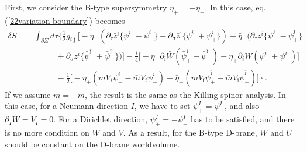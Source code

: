 \documentclass[a4paper,12pt]{article}
\numberwithin{equation}{section}
\newcommand{\del}{\partial}
\newcommand{\ib}{\bar{\imath}}
\newcommand{\jb}{\bar{\jmath}}
\newcommand{\mb}{\bar{m}}
\newcommand{\zb}{\bar{z}}
\newcommand{\nn}{\nonumber\\}
\newcommand{\psb}{\bar{\psi}}
\newcommand{\etb}{\bar{\eta}}
\newcommand{\Wb}{\bar{W}}
\begin{document}
First, we consider the B-type supersymmetry $\eta_{+}=-\eta_{-}$.
In this case, eq.(\ref{22variation-boundary}) becomes
\begin{align}
 \delta S &= \int_{\del \Sigma}d\tau\Bigg\{
\frac12 g_{i\jb}\Big[
  -\eta_{+}(
       \del_{\tau}  \zb^{\jb}\{\psi_{-}^{i}-\psi_{+}^{i}\}
     + \del_{\sigma}\zb^{\jb}\{\psi_{-}^{i}+\psi_{+}^{i}\}
       )
  +\bar{\eta}_{+}(
       \del_{\tau}  z^{i}\{\psb_{-}^{\jb}-\psb_{+}^{\jb}\}
\nn & \qquad \qquad
     + \del_{\sigma}z^{i}\{\psb_{-}^{\jb}+\psb_{+}^{\jb}\}
       )
  \Big]
-\frac{i}{4}\Big[
     -\eta_{+}\del_{\ib}\Wb(\psb^{\ib}_{+}+\psb^{\ib}_{-})
     -\etb_{+}\del_{ i } W (\psi^{ i }_{+}+\psi^{ i }_{-})
    \Big]
\nn & \qquad \qquad
 -\frac12\Big[
 -\eta_{+}(m  V_{ i }\psi^{ i }_{+}-\mb V_{i}\psi^{i}_{-})
 +\etb_{+}(m  V_{\ib}\psb^{\ib}_{+}-\mb V_{\ib}\psb^{\ib}_{-})
   \Big] \Bigg\}~.
\end{align}
If we assume $m=-\mb$, the result is the same as the Killing spinor analysis.
In this case, for a Neumann direction $I$,
we have to set $\psi^{I}_{+}=\psi^{I}_{-}$, and also $\del_{I}W=V_{I}=0$. 
For a Dirichlet direction, $\psi^{I}_{+}= - \psi^{I}_{-}$ has to be
satisfied, and there is no more condition on $W$ and $V$. 
As a result, for the B-type D-brane,
$W$ and $U$ should be constant on the D-brane worldvolume.
\end{document}
